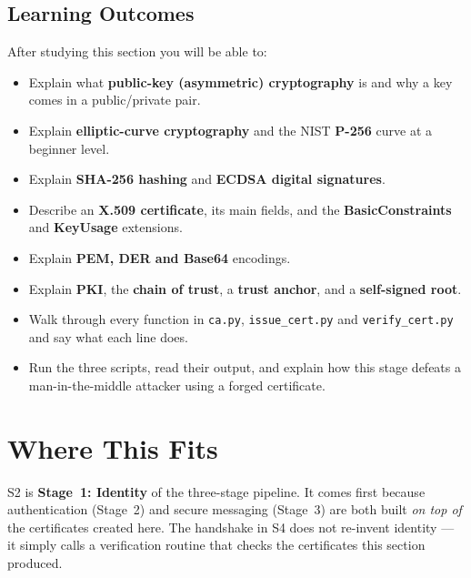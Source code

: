 \documentclass[11pt,a4paper]{report}
\begin{document}
\subsection*{Learning Outcomes}
After studying this section you will be able to:
\begin{itemize}
  \item Explain what \textbf{public-key (asymmetric) cryptography} is and why a
        key comes in a public/private pair.
  \item Explain \textbf{elliptic-curve cryptography} and the NIST \textbf{P-256}
        curve at a beginner level.
  \item Explain \textbf{SHA-256 hashing} and \textbf{ECDSA digital signatures}.
  \item Describe an \textbf{X.509 certificate}, its main fields, and the
        \textbf{BasicConstraints} and \textbf{KeyUsage} extensions.
  \item Explain \textbf{PEM, DER and Base64} encodings.
  \item Explain \textbf{PKI}, the \textbf{chain of trust}, a \textbf{trust
        anchor}, and a \textbf{self-signed root}.
  \item Walk through every function in \texttt{ca.py}, \texttt{issue\_cert.py}
        and \texttt{verify\_cert.py} and say what each line does.
  \item Run the three scripts, read their output, and explain how this stage
        defeats a man-in-the-middle attacker using a forged certificate.
\end{itemize}

\section{Where This Fits}

S2 is \textbf{Stage~1: Identity} of the three-stage pipeline. It comes first
because authentication (Stage~2) and secure messaging (Stage~3) are both built
\emph{on top of} the certificates created here. The handshake in S4 does not
re-invent identity --- it simply calls a verification routine that checks the
certificates this section produced.
\end{document}
